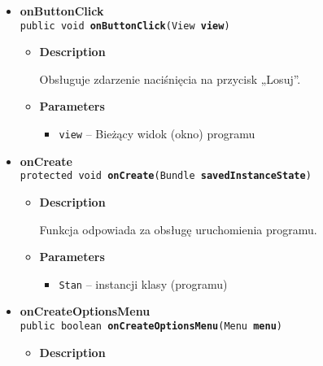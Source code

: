 \documentclass[11pt,a4paper]{article}
\begin{document}
{{{{{\begin{itemize}
{\begin{itemize}
{Obsługuje procedurę dodawania kostek. Dodanie kostki skutkuje odsłonięciem wartości liczbowej, zakresu liczb i ilustracji przedstawiającej wartość na kostce oraz wyświetleniem komunikatu dla użytkownika.
}
\item{
{\bf  Parameters}
  \begin{itemize}
   \item{
\texttt{view} -- Bieżący widok (okno) programu.}
  \end{itemize}
}%
\end{itemize}
}%
\item{ 
\hypertarget{com.example.kostkadogry.MainActivity.onButtonClick(View)}{{\bf  onButtonClick}\\}
\texttt{public void\ {\bf  onButtonClick}(\texttt{View} {\bf  view})
\label{com.example.kostkadogry.MainActivity.onButtonClick(View)}}%
\begin{itemize}
\item{
{\bf  Description}

Obsługuje zdarzenie naciśnięcia na przycisk „Losuj”.
}
\item{
{\bf  Parameters}
  \begin{itemize}
   \item{
\texttt{view} -- Bieżący widok (okno) programu}
  \end{itemize}
}%
\end{itemize}
}%
\item{ 
\hypertarget{com.example.kostkadogry.MainActivity.onCreate(Bundle)}{{\bf  onCreate}\\}
\texttt{protected void\ {\bf  onCreate}(\texttt{Bundle} {\bf  savedInstanceState})
\label{com.example.kostkadogry.MainActivity.onCreate(Bundle)}}%
\begin{itemize}
\item{
{\bf  Description}

Funkcja odpowiada za obsługę uruchomienia programu.
}
\item{
{\bf  Parameters}
  \begin{itemize}
   \item{
\texttt{Stan} -- instancji klasy (programu)}
  \end{itemize}
}%
\end{itemize}
}%
\item{ 
\hypertarget{com.example.kostkadogry.MainActivity.onCreateOptionsMenu(Menu)}{{\bf  onCreateOptionsMenu}\\}
\texttt{public boolean\ {\bf  onCreateOptionsMenu}(\texttt{Menu} {\bf  menu})
\label{com.example.kostkadogry.MainActivity.onCreateOptionsMenu(Menu)}}%
\begin{itemize}
\item{
{\bf  Description}

}
\end{itemize}}
\end{itemize}}}}}}
\end{document}
